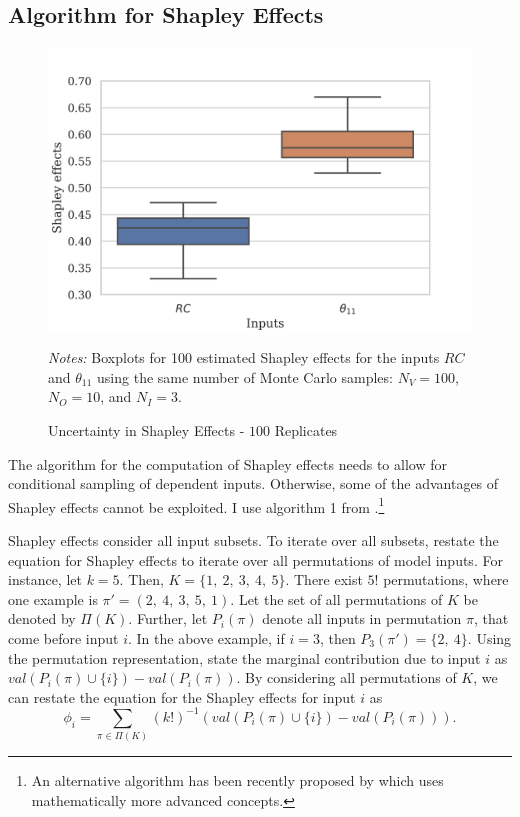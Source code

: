 \subsection{Algorithm for Shapley Effects} \label{comp_alg}

\begin{figure}[t]
	\caption{Uncertainty in Shapley Effects - $100$ Replicates}
    \label{boxplot_shapley}
	\begin{centering}
	\vspace*{-4mm}
	\begin{centering}
	\includegraphics[scale=0.9]{../figures/boxplot_shapley_effects_100.png}

	\end{centering}
	\end{centering}

	\small
	\textit{Notes:} Boxplots for 100 estimated Shapley effects for the inputs $RC$ and $\theta_{11}$ using the same number of Monte Carlo samples: $N_V=100$, $N_O=10$, and $N_I=3$.
\end{figure}

The algorithm for the computation of Shapley effects needs to allow for conditional sampling of dependent inputs. Otherwise, some of the advantages of Shapley effects cannot be exploited. I use algorithm 1 from \citet{SNS16}.\footnote{An alternative algorithm has been recently proposed by \citet{PRB20} which uses mathematically more advanced concepts.}

Shapley effects consider all input subsets. To iterate over all subsets, \citet{SNS16} restate the equation for Shapley effects to iterate over all permutations of model inputs. For instance, let $k=5$. Then, $K=\{1,\ 2,\ 3,\ 4,\ 5\}$. There exist $5!$ permutations, where one example is $\pi'=(2,\ 4,\ 3,\ 5,\ 1)$. Let the set of all permutations of $K$ be denoted by $\Pi(K)$. Further, let $P_i(\pi)$ denote all inputs in permutation $\pi$, that come before input $i$. In the above example, if $i=3$, then $P_3(\pi')=\{2,\ 4\}$. Using the permutation representation, \citet{SNS16} state the marginal contribution due to input $i$ as $val(P_i(\pi) \cup\{i\}) - val(P_i(\pi))$. By considering all permutations of $K$, we can restate the equation for the Shapley effects for input $i$ as
\begin{equation*}
\phi_i=\sum_{\pi \in \Pi(K)} (k!)^{-1} (val(P_i(\pi) \cup\{i\}) - val(P_i(\pi))).
\end{equation*}

